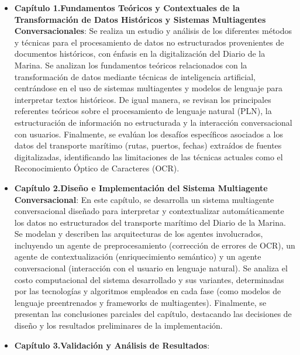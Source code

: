 \begin{itemize}
	\item \textbf{Capítulo 1.Fundamentos Teóricos y Contextuales de la Transformación de Datos Históricos y Sistemas Multiagentes Conversacionales}:
	Se realiza un estudio y análisis de los diferentes métodos y técnicas para el procesamiento de datos no estructurados provenientes de documentos históricos, con énfasis en la digitalización del Diario de la Marina. Se analizan los fundamentos teóricos relacionados con la transformación de datos mediante técnicas de inteligencia artificial, centrándose en el uso de sistemas multiagentes y modelos de lenguaje para interpretar textos históricos. De igual manera, se revisan los principales referentes teóricos sobre el procesamiento de lenguaje natural (PLN), la estructuración de información no estructurada y la interacción conversacional con usuarios. Finalmente, se evalúan los desafíos específicos asociados a los datos del transporte marítimo (rutas, puertos, fechas) extraídos de fuentes digitalizadas, identificando las limitaciones de las técnicas actuales como el Reconocimiento Óptico de Caracteres (OCR).
	\item \textbf{Capítulo 2.Diseño e Implementación del Sistema Multiagente Conversacional}:
	En este capítulo, se desarrolla un sistema multiagente conversacional diseñado para interpretar y contextualizar automáticamente los datos no estructurados del transporte marítimo del Diario de la Marina. Se modelan y describen las arquitecturas de los agentes involucrados, incluyendo un agente de preprocesamiento (corrección de errores de OCR), un agente de contextualización (enriquecimiento semántico) y un agente conversacional (interacción con el usuario en lenguaje natural). Se analiza el costo computacional del sistema desarrollado y sus variantes, determinadas por las tecnologías y algoritmos empleados en cada fase (como modelos de lenguaje preentrenados y frameworks de multiagentes). Finalmente, se presentan las conclusiones parciales del capítulo, destacando las decisiones de diseño y los resultados preliminares de la implementación.
	\item \textbf{Capítulo 3.Validación y Análisis de Resultados}:

\end{itemize}
